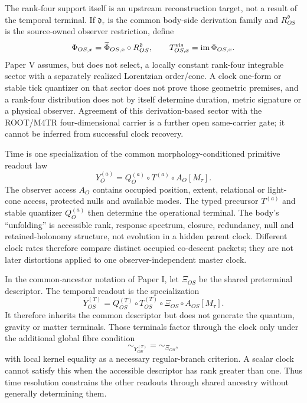 \documentclass[11pt]{article}
\begin{document}
The rank-four support itself is an upstream reconstruction target, not a
result of the temporal terminal.  If $\mathfrak d_\tau$ is the common
body-side derivation family and $R^{\mathfrak d}_{OS}$ is the source-owned
observer restriction, define
\begin{equation}
 \Phi_{OS,x}
 =\widetilde\Phi_{OS,x}\circ R^{\mathfrak d}_{OS},
 \qquad
 T^{\rm vis}_{OS,x}=\operatorname{im}\Phi_{OS,x}.
 \label{eq:temporal-visible-tangent-boundary}
\end{equation}
Paper V assumes, but does not select, a locally constant rank-four integrable
sector with a separately realized Lorentzian order/cone.  A clock one-form or
stable tick quantizer on that sector does not prove those geometric
premises, and a rank-four distribution does not by itself determine duration,
metric signature or a physical observer.  Agreement of this derivation-based
sector with the ROOT/M4TR four-dimensional carrier is a further open
same-carrier gate; it cannot be inferred from successful clock recovery.

Time is one specialization of the common morphology-conditioned primitive
readout law
\begin{equation}
 Y_O^{(a)}=Q_O^{(a)}\circ T^{(a)}\circ A_O[M_\tau].
 \label{eq:mcpr-time-interface}
\end{equation}
The observer access $A_O$ contains occupied position, extent, relational or
light-cone access, protected nulls and available modes. The typed precursor
$T^{(a)}$ and stable quantizer $Q_O^{(a)}$ then determine the operational
terminal. The body's ``unfolding'' is accessible rank, response spectrum,
closure, redundancy, null and retained-holonomy structure, not evolution in a
hidden parent clock.
Different clock rates therefore compare distinct occupied co-descent packets;
they are not later distortions applied to one observer-independent master
clock.

In the common-ancestor notation of Paper I, let \(\Xi_{OS}\) be the shared
preterminal descriptor.  The temporal readout is the specialization
\begin{equation}
 Y_{OS}^{(T)}
 =
 Q_{OS}^{(T)}\circ T_{OS}^{(T)}
 \circ\Xi_{OS}\circ A_{OS}[M_\tau].
 \label{eq:time-common-ancestor-specialization}
\end{equation}
It therefore inherits the common descriptor but does not generate the
quantum, gravity or matter terminals.  Those terminals factor through the
clock only under the additional global fibre condition
\begin{equation}
 \sim_{Y_{OS}^{(T)}}=\sim_{\Xi_{OS}},
 \label{eq:time-ancestor-sufficiency}
\end{equation}
with local kernel equality as a necessary regular-branch criterion.  A scalar
clock cannot satisfy this when the accessible descriptor has rank greater
than one.  Thus time resolution constrains the other readouts through shared
ancestry without generally determining them.
\end{document}
